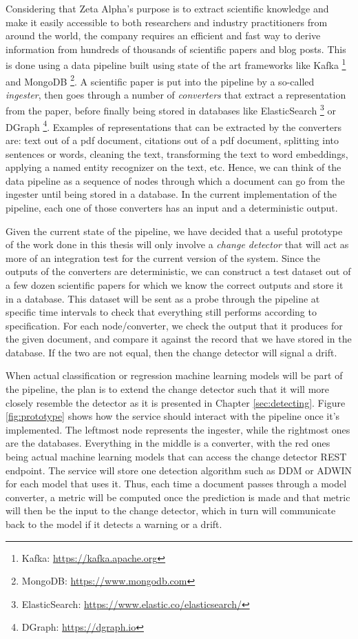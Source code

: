 \documentclass[12pt]{extreport}
\begin{document}
Considering that Zeta Alpha's purpose is to extract scientific knowledge and make it easily accessible to both researchers and industry practitioners from around the world, the company requires an efficient and fast way to derive information from hundreds of thousands of scientific papers and blog posts. This is done using a data pipeline built using state of the art frameworks like Kafka \footnote{Kafka: \url{https://kafka.apache.org}} and MongoDB \footnote{MongoDB: \url{https://www.mongodb.com}}. A scientific paper is put into the pipeline by a so-called \emph{ingester}, then goes through a number of \emph{converters} that extract a representation from the paper, before finally being stored in databases like ElasticSearch \footnote{ElasticSearch: \url{https://www.elastic.co/elasticsearch/}} or DGraph \footnote{DGraph: \url{https://dgraph.io}}. Examples of representations that can be extracted by the converters are: text out of a pdf document, citations out of a pdf document, splitting into sentences or words, cleaning the text, transforming the text to word embeddings, applying a named entity recognizer on the text, etc. Hence, we can think of the data pipeline as a sequence of nodes through which a document can go from the ingester until being stored in a database. In the current implementation of the pipeline, each one of those converters has an input and a deterministic output.

Given the current state of the pipeline, we have decided that a useful prototype of the work done in this thesis will only involve a \emph{change detector} that will act as more of an integration test for the current version of the system. Since the outputs of the converters are deterministic, we can construct a test dataset out of a few dozen scientific papers for which we know the correct outputs and store it in a database. This dataset will be sent as a probe through the pipeline at specific time intervals to check that everything still performs according to specification. For each node/converter, we check the output that it produces for the given document, and compare it against the record that we have stored in the database. If the two are not equal, then the change detector will signal a drift.

When actual classification or regression machine learning models will be part of the pipeline, the plan is to extend the change detector such that it will more closely resemble the detector as it is presented in Chapter \ref{sec:detecting}. Figure \ref{fig:prototype} shows how the service should interact with the pipeline once it's implemented. The leftmost node represents the ingester, while the rightmost ones are the databases. Everything in the middle is a converter, with the red ones being actual machine learning models that can access the change detector REST endpoint. The service will store one detection algorithm such as DDM or ADWIN for each model that uses it. Thus, each time a document passes through a model converter, a metric will be computed once the prediction is made and that metric will then be the input to the change detector, which in turn will communicate back to the model if it detects a warning or a drift.
\end{document}
